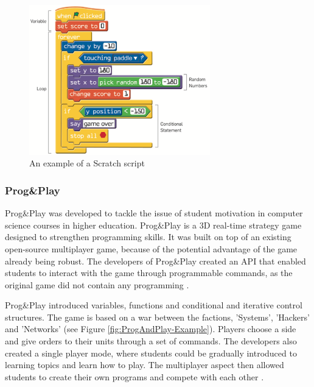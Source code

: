 \documentclass[a4paper,11.5pt]{report}
\numberwithin{figure}{section}
\numberwithin{table}{section}
\numberwithin{equation}{section}
\numberwithin{equation}{section}
\begin{document}



\begin{figure}[H]
 \centering
    \includegraphics[width=0.7\textwidth]{Scratch-Example}
       \captionsetup{justification=centering}
\caption{An example of a Scratch script  {\citep{resnick2009}}}
\label{fig:Scratch-Example}
\end{figure}

\subsubsection*{Prog\&Play}

Prog\&Play was developed to tackle the issue of student motivation in computer science courses in higher education. Prog\&Play is a 3D real-time strategy game designed to strengthen programming skills. It was built on top of an existing open-source multiplayer game, because of the potential advantage of the game already being robust. The developers of Prog\&Play created an API that enabled students to interact with the game through programmable commands, as the original game did not contain any programming \citep{muratet2011}.

Prog\&Play introduced variables, functions and conditional and iterative control structures. The game is based on a war between the factions, 'Systems', 'Hackers' and 'Networks' (see Figure \ref{fig:ProgAndPlay-Example}). Players choose a side and give orders to their units through a set of commands. The developers also created a single player mode, where students could be gradually introduced to learning topics and learn how to play. The multiplayer aspect then allowed students to create their own programs and compete with each other \citep{muratet2011}.
\end{document}
